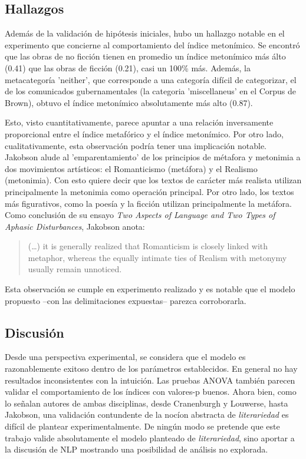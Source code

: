 \documentclass[12pt,letterpaper,twoside]{article}
\begin{document}
\subsection{Hallazgos}
\label{sec:orgd7dd6e5}

Además de la validación de hipótesis iniciales, hubo un hallazgo
notable en el experimento que concierne al comportamiento del
índice metonímico. Se encontró que las obras de no ficción tienen
en promedio un índice metonímico más álto (0.41) que las obras de
ficción (0.21), casi un 100\% más. Además, la metacategoría
'neither', que corresponde a una categoría difícil de categorizar,
el de los comunicados gubernamentales (la categoria 'miscellaneus'
en el Corpus de Brown), obtuvo el índice metonímico absolutamente
más alto (0.87).

Esto, visto cuantitativamente, parece apuntar a una relación
inversamente proporcional entre el índice metafórico y el índice
metonímico. Por otro lado, cualitativamente, esta observación
podría tener una implicación notable.  Jakobson alude al
'emparentamiento' de los principios de métafora y metonimia a dos
movimientos artísticos: el Romanticismo (metáfora) y el Realismo
(metonimia). Con esto quiere decir que los textos de carácter más
realista utilizan principalmente la metonimia como operación
principal. Por otro lado, los textos más figurativos, como la
poesía y la ficción utilizan principalmente la metáfora.  Como
conclusión de su ensayo \emph{Two Aspects of Language and Two Types of
Aphasic Disturbances}, Jakobson anota:

\begin{quote}
(\ldots{})  it is generally realized that Romanticism is closely linked
with metaphor, whereas the equally intimate ties of Realism with
metonymy usually remain unnoticed. \cite[114]{jakobson1956two}
\end{quote}

Esta observación se cumple en experimento realizado y es notable
que el modelo propuesto --con las delimitaciones expuestas--
parezca corroborarla.


\subsection{Discusión}
\label{sec:org03907da}


Desde una perspectiva experimental, se considera que el modelo es
razonablemente exitoso dentro de los parámetros establecidos. En
general no hay resultados inconsistentes con la intuición. Las pruebas
ANOVA también parecen validar el comportamiento de los índices con
valores-p buenos. Ahora bien, como lo señalan autores de ambas
disciplinas, desde Cranenburgh y Louwerse, hasta Jakobson, una
validación contundente de la nocíon abstracta de \emph{literariedad} es
difícil de plantear experimentalmente. De ningún modo se pretende que
este trabajo valide absolutamente el modelo planteado de
\emph{literariedad}, sino aportar a la discusión de NLP mostrando una
posibilidad de análisis no explorada.
\end{document}
